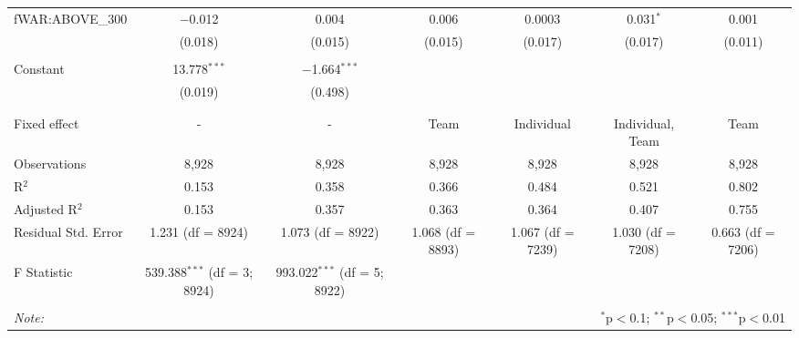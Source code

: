 \begin{table}[!htbp]
\begin{tabular}{@{\extracolsep{5pt}}lcccccc}
 fWAR:ABOVE\_300 & $-$0.012 & 0.004 & 0.006 & 0.0003 & 0.031$^{*}$ & 0.001 \\
  & (0.018) & (0.015) & (0.015) & (0.017) & (0.017) & (0.011) \\
  & & & & & & \\
 Constant & 13.778$^{***}$ & $-$1.664$^{***}$ &  &  &  &  \\
  & (0.019) & (0.498) &  &  &  &  \\
  & & & & & & \\
\hline \\[-1.8ex]
Fixed effect & - & - & Team & Individual & Individual, Team & Team \\
Observations & 8,928 & 8,928 & 8,928 & 8,928 & 8,928 & 8,928 \\
R$^{2}$ & 0.153 & 0.358 & 0.366 & 0.484 & 0.521 & 0.802 \\
Adjusted R$^{2}$ & 0.153 & 0.357 & 0.363 & 0.364 & 0.407 & 0.755 \\
Residual Std. Error & 1.231 (df = 8924) & 1.073 (df = 8922) & 1.068 (df = 8893) & 1.067 (df = 7239) & 1.030 (df = 7208) & 0.663 (df = 7206) \\
F Statistic & 539.388$^{***}$ (df = 3; 8924) & 993.022$^{***}$ (df = 5; 8922) &  &  &  &  \\
\hline
\hline \\[-1.8ex]
\textit{Note:}  & \multicolumn{6}{r}{$^{*}$p$<$0.1; $^{**}$p$<$0.05; $^{***}$p$<$0.01} \\
\end{tabular}
\end{table}
